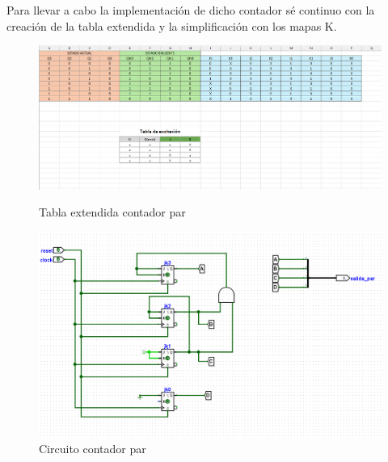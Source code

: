 \documentclass{article}
\begin{document}
Para llevar a cabo la implementación de dicho contador sé continuo con la creación de la tabla extendida 
y la simplificación con los mapas K.
\begin{figure}[h]
    \centering
    \begin{minipage}{0.45\textwidth} %
      \centering
      \includegraphics[width=\linewidth]{imagenes/CONTADOR_PAR_TABLA.png} %
      \caption{Tabla extendida contador par}
      \label{fig:tablacontadorpar}
    \end{minipage}
    \hfill
    \begin{minipage}{0.45\textwidth} %
      \centering
      \includegraphics[width=\linewidth]{imagenes/contador_par_circuito.png} %
      \caption{Circuito contador par}
      \label{fig:circuitocontadorpar}
    \end{minipage}
\end{figure}
\end{document}
